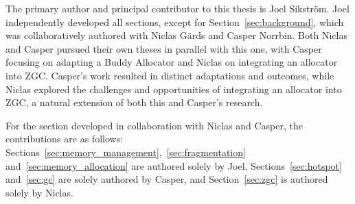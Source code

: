 
The primary author and principal contributor to this thesis is Joel Sikström. Joel independently developed all sections, except for Section~\ref{sec:background}, which was collaboratively authored with Niclas Gärds and Casper Norrbin. Both Niclas and Casper pursued their own theses in parallel with this one, with Casper focusing on adapting a Buddy Allocator and Niclas on integrating an allocator into ZGC. Casper's work resulted in distinct adaptations and outcomes, while Niclas explored the challenges and opportunities of integrating an allocator into ZGC, a natural extension of both this and Casper's research.

For the section developed in collaboration with Niclas and Casper, the contributions are as follows: Sections~\ref{sec:memory_management},~\ref{sec:fragmentation} and~\ref{sec:memory_allocation} are authored solely by Joel, Sections~\ref{sec:hotspot} and~\ref{sec:gc} are solely authored by Casper, and Section~\ref{sec:zgc} is authored solely by Niclas.



